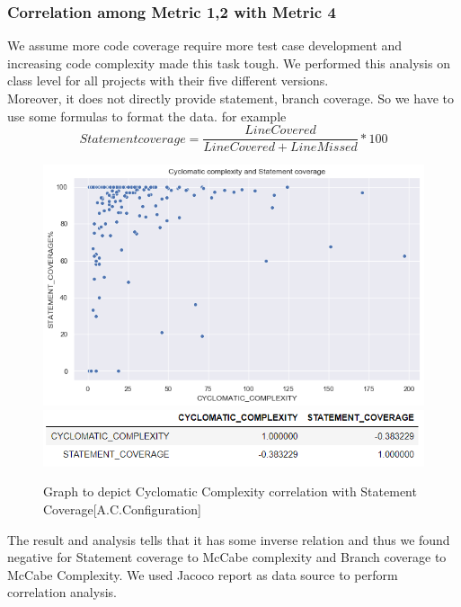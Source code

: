 \documentclass[letterpaper, 12 pt, conference]{ieeetran}  %
\begin{document}
\subsubsection{Correlation among Metric 1,2 with Metric 4 }
We assume more code coverage require more test case development and increasing code complexity made this task tough. We performed this analysis on class level for all projects with their five different versions.\\Moreover, it does not directly provide statement, branch coverage. So we have to use some formulas to format the data. for example \[ Statement coverage = \dfrac{LineCovered}{LineCovered + LineMissed}*100\]
\begin{figure}[H]
    \centering
     \includegraphics[scale=0.40]{metric4 vs 1 commons-configuration.png}%
     \\ \includegraphics[scale=0.60]{metric4 vs 1 commons-config_spearmanr.png} %
    \caption{Graph to depict Cyclomatic Complexity correlation with Statement Coverage{\footnotesize[A.C.Configuration]}}
\end{figure}
The result and analysis tells that it has some inverse relation and thus we found negative for Statement coverage to McCabe complexity and Branch coverage to McCabe Complexity. We used Jacoco report as data source to perform correlation analysis.
\end{document}
